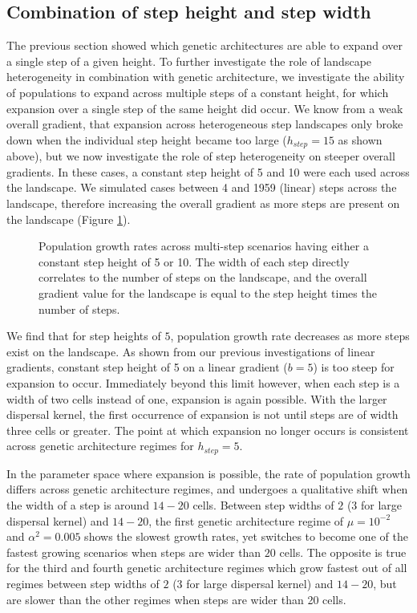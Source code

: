 \subsection{Combination of step height and step width}

The previous section showed which genetic architectures are able to expand over a single step of a given height. To further investigate the role of landscape heterogeneity in combination with genetic architecture, we investigate the ability of populations to expand across multiple steps of a constant height, for which expansion over a single step of the same height did occur. We know from a weak overall gradient, that expansion across heterogeneous step landscapes only broke down when the individual step height became too large ($h_{step} = 15$ as shown above), but we now investigate the role of step heterogeneity on steeper overall gradients. In these cases, a constant step height of 5 and 10 were each used across the landscape. We simulated cases between 4 and 1959 (linear) steps across the landscape, therefore increasing the overall gradient as more steps are present on the landscape (Figure \ref{fig:multistep}).

\begin{figure}[h]
\centering
{}
\caption[Population growth rates across multi-step scenarios.]{Population growth rates across multi-step scenarios having either a constant step height of 5 or 10. The width of each step directly correlates to the number of steps on the landscape, and the overall gradient value for the landscape is equal to the step height times the number of steps.}
\label{fig:multistep}
\end{figure}

We find that for step heights of $5$, population growth rate decreases as more steps exist on the landscape. As shown from our previous investigations of linear gradients, constant step height of 5 on a linear gradient ($b = 5$) is too steep for expansion to occur. Immediately beyond this limit however, when each step is a width of two cells instead of one, expansion is again possible. With the larger dispersal kernel, the first occurrence of expansion is not until steps are of width three cells or greater. The point at which expansion no longer occurs is consistent across genetic architecture regimes for $h_{step} = 5$.

In the parameter space where expansion is possible, the rate of population growth differs across genetic architecture regimes, and undergoes a qualitative shift when the width of a step is around $14 - 20$ cells. Between step widths of $2$ ($3$ for large dispersal kernel) and $14 - 20$, the first genetic architecture regime of $\mu = 10^{-2}$ and $\alpha^2 = 0.005$ shows the slowest growth rates, yet switches to become one of the fastest growing scenarios when steps are wider than $20$ cells. The opposite is true for the third and fourth genetic architecture regimes which grow fastest out of all regimes between step widths of $2$ ($3$ for large dispersal kernel) and $14 - 20$, but are slower than the other regimes when steps are wider than 20 cells.

